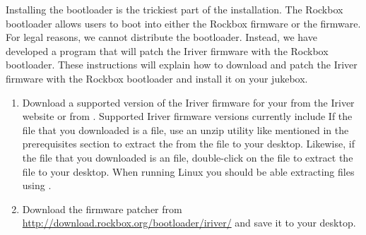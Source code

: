 
  Installing the bootloader is the trickiest part of the installation.
  The Rockbox bootloader allows users to boot into either the Rockbox 
  firmware or the \playerman{} firmware. For legal reasons, we cannot distribute 
  the bootloader. Instead, we have developed a program that will patch the 
  Iriver firmware with the Rockbox bootloader. These instructions will explain 
  how to download and patch the Iriver firmware with the Rockbox bootloader 
  and install it on your jukebox.


\begin{enumerate}
  \item Download a supported version of the Iriver firmware for your 
  \playername{} from the Iriver website or from 
  .
  Supported Iriver firmware versions currently include 
  If the file that you downloaded is a  file, use an unzip 
  utility like mentioned in the prerequisites section to extract
  the  from the  file
  to your desktop. Likewise, if the file that you downloaded is an 
   file, double-click on the  file to extract 
  the  file to your desktop.
  When running Linux you should be able extracting 
  files using .
  \item Download the firmware patcher  from 
  \url{http://download.rockbox.org/bootloader/iriver/} and save it to your desktop.
\end{enumerate}
